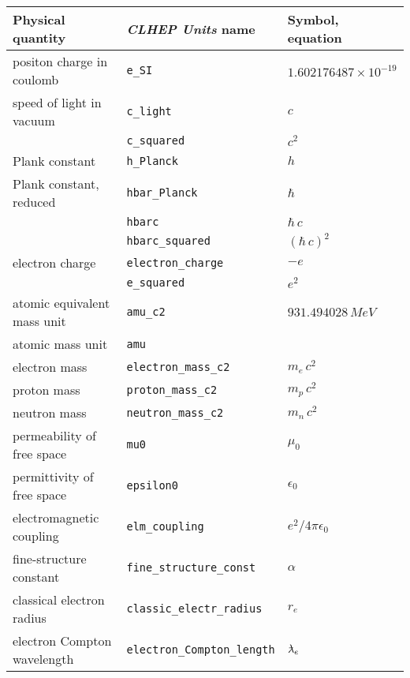 \documentclass{article}
\newcommand{\lbar}
           {\makebox[0mm][l]{\hspace{.1em}\rule[.9ex]{.4em}{.4pt}}\lambda}
\begin{document}
\begin{table}
\centering
\begin{tabular}{|l|l|l|}
\hline
\bf{Physical quantity}    &\bf{{\it CLHEP Units} name}&\bf{Symbol, equation}  \\
\hline
positon charge in coulomb &{\tt e\_{}SI}         &$ 1.602176487\times10^{-19}$\\
speed of light in vacuum  &{\tt c\_{}light}      &$ c                      $\\
                          &{\tt c\_{}squared}    &$ c^2                    $\\
Plank constant            &{\tt h\_{}Planck}     &$ h                      $\\
Plank constant, reduced   &{\tt hbar\_{}Planck}  &$ \hbar                  $\\
                          &{\tt hbarc}           &$ \hbar\,c               $\\
                          &{\tt hbarc\_{}squared}&$ (\hbar\,c)^2           $\\
electron charge           &{\tt electron\_{}charge}&$ -e                   $\\
                          &{\tt e\_{}squared}    &$ e^2                    $\\
atomic equivalent mass unit&{\tt amu\_{}c2}      &$ 931.494028\,MeV        $\\
atomic mass unit          &{\tt amu}             &                          \\
electron mass             &{\tt electron\_{}mass\_{}c2}&$ m_e\,c^2         $\\
proton mass               &{\tt proton\_{}mass\_{}c2}  &$ m_p\,c^2         $\\
neutron mass              &{\tt neutron\_{}mass\_{}c2} &$ m_n\,c^2         $\\
permeability of free space&{\tt mu0}             &$ \mu_0                  $\\
permittivity of free space&{\tt epsilon0}        &$ \epsilon_0             $\\
electromagnetic coupling  &{\tt elm\_{}coupling} &$ e^2/4\pi\epsilon_0     $\\
fine-structure constant   &{\tt fine\_{}structure\_{}const} &$ \alpha      $\\
classical electron radius &{\tt classic\_{}electr\_{}radius}&$  r_e        $\\
electron Compton wavelength&{\tt electron\_{}Compton\_{}length}&$ \lbar_e  $\\

\end{tabular}
\end{table}
\end{document}
